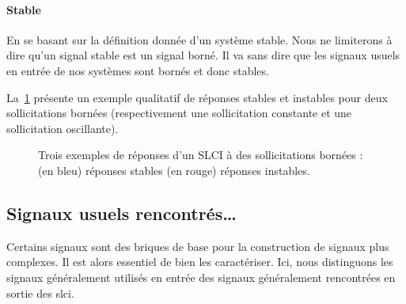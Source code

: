 \paragraph{Stable}
En se basant sur la définition donnée d'un système stable.
Nous ne limiterons à dire qu'un signal stable est un signal 
borné. Il va sans dire que les signaux usuels en entrée
de nos systèmes sont bornés et donc stables.

La~\cref{fig-stabilite_signaux} présente un exemple qualitatif de réponses 
stables et instables pour deux sollicitations bornées (respectivement une 
sollicitation constante et une sollicitation oscillante).
\begin{figure}[!ht]
    \centering
    
    
    

    
    
    
    \caption{Trois exemples de réponses d'un SLCI à des sollicitations bornées :
            (en bleu)  réponses stables 
            (en rouge) réponses instables.\label{fig-stabilite_signaux}}
\end{figure}
\newpage

\captionsetup{width=0.9\linewidth,labelfont=bf}
\subsection{Signaux usuels rencontrés\ldots\label{sec-signaux_usuels}}
Certains signaux sont des briques de base pour la construction de
signaux plus complexes. Il est alors essentiel de bien les caractériser.
Ici, nous distinguons les signaux généralement utilisés en 
entrée des signaux généralement rencontrées en sortie des \gls{slci}.
